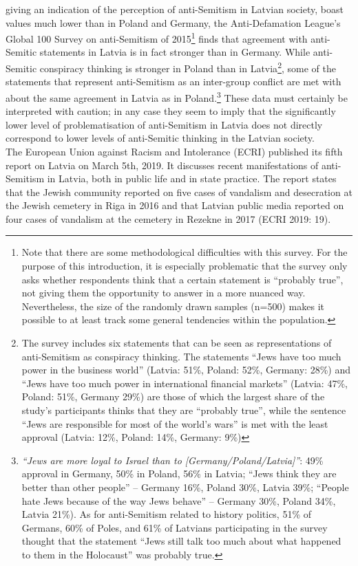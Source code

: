 giving an indication of the perception of anti-Semitism in Latvian society, boast values much lower than in Poland and Germany, the Anti-Defamation League’s Global 100 Survey on anti-Semitism of 2015\footnote{Note that there are some methodological difficulties with this survey. For the purpose of this introduction, it is especially problematic that the survey only asks whether respondents think that a certain statement is ``probably true'', not giving them the opportunity to answer in a more nuanced way. Nevertheless, the size of the randomly drawn samples (n=500) makes it possible to at least track some general tendencies within the population.} finds that agreement with anti-Semitic statements in Latvia is in fact stronger than in Germany. While anti-Semitic conspiracy thinking is stronger in Poland than in Latvia\footnote{The survey includes six statements that can be seen as representations of anti-Semitism as conspiracy thinking. The statements ``Jews have too much power in the business world'' (Latvia: 51\%, Poland: 52\%, Germany: 28\%) and ``Jews have too much power in international financial markets'' (Latvia: 47\%, Poland: 51\%, Germany 29\%) are those of which the largest share of the study’s participants thinks that they are ``probably true'', while the sentence ``Jews are responsible for most of the world's wars'' is met with the least approval (Latvia: 12\%, Poland: 14\%, Germany: 9\%)}, some of the statements that represent anti-Semitism as an inter-group conflict are met with about the same agreement in Latvia as in Poland.\footnote{\textit{``Jews are more loyal to Israel than to [Germany/Poland/Latvia]''}: 49\% approval in Germany, 50\% in Poland, 56\% in Latvia; ``Jews think they are better than other people'' – Germany 16\%, Poland 30\%, Latvia 39\%; ``People hate Jews because of the way Jews behave'' – Germany 30\%, Poland 34\%, Latvia 21\%). As for anti-Semitism related to history politics, 51\% of Germans, 60\% of Poles, and 61\% of Latvians participating in the survey thought that the statement ``Jews still talk too much about what happened to them in the Holocaust'' was probably true.} These data must certainly be interpreted with caution; in any case they seem to imply that the significantly lower level of problematisation of anti-Semitism in Latvia does not directly correspond to lower levels of anti-Semitic thinking in the Latvian society.\\
The European Union against Racism and Intolerance (ECRI) published its fifth report on Latvia on March 5th, 2019. It discusses recent manifestations of anti-Semitism in Latvia, both in public life and in state practice. The report states that the Jewish community reported on five cases of vandalism and desecration at the Jewish cemetery in Riga in 2016 and that Latvian public media reported on four cases of vandalism at the cemetery in Rezekne in 2017 (ECRI 2019: 19).\\
